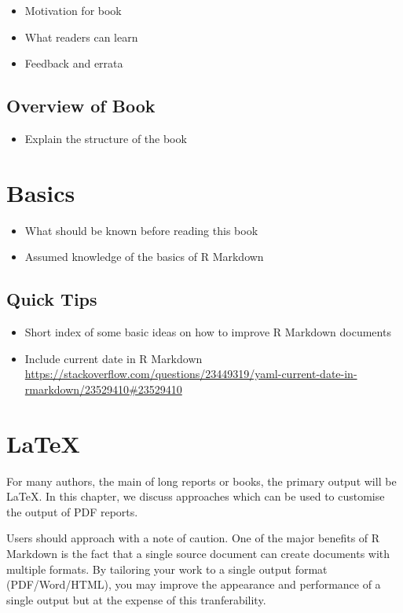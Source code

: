 \documentclass[]{book}
\providecommand{\tightlist}{%
  \setlength{\itemsep}{0pt}\setlength{\parskip}{0pt}}
\begin{document}
\begin{itemize}
\tightlist
\item
  Motivation for book
\item
  What readers can learn
\item
  Feedback and errata
\end{itemize}

\section{Overview of Book}\label{overview-of-book}

\begin{itemize}
\tightlist
\item
  Explain the structure of the book
\end{itemize}

\chapter{Basics}\label{basics}

\begin{itemize}
\tightlist
\item
  What should be known before reading this book
\item
  Assumed knowledge of the basics of R Markdown
\end{itemize}

\section{Quick Tips}\label{quick-tips}

\begin{itemize}
\item
  Short index of some basic ideas on how to improve R Markdown documents
\item
  Include current date in R Markdown
  \url{https://stackoverflow.com/questions/23449319/yaml-current-date-in-rmarkdown/23529410\#23529410}
\end{itemize}

\chapter{LaTeX}\label{latex}

For many authors, the main of long reports or books, the primary output
will be LaTeX. In this chapter, we discuss approaches which can be used
to customise the output of PDF reports.

Users should approach with a note of caution. One of the major benefits
of R Markdown is the fact that a single source document can create
documents with multiple formats. By tailoring your work to a single
output format (PDF/Word/HTML), you may improve the appearance and
performance of a single output but at the expense of this
tranferability.
\end{document}
